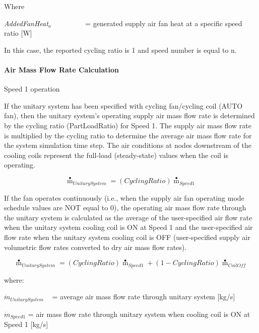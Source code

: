 Where

\emph{AddedFanHeat\(_{o}\)}~~~~~~~~~ = generated supply air fan heat at a specific speed ratio {[}W{]}

In this case, the reported cycling ratio is 1 and speed number is equal to n.

\paragraph{Air Mass Flow Rate Calculation}\label{air-mass-flow-rate-calculation}

Speed 1 operation

If the unitary system has been specified with cycling fan/cycling coil (AUTO fan), then the unitary system's operating supply air mass flow rate is determined by the cycling ratio (PartLoadRatio) for Speed 1. The supply air mass flow rate is multiplied by the cycling ratio to determine the average air mass flow rate for the system simulation time step. The air conditions at nodes downstream of the cooling coils represent the full-load (steady-state) values when the coil is operating.

\begin{equation}
{{\mathop m\limits^ \bullet  }_{UnitarySystem}} = \left( {CyclingRatio} \right){{\mathop m\limits^ \bullet  }_{Speed1}}
\end{equation}

If the fan operates continuously (i.e., when the supply air fan operating mode schedule values are NOT equal to 0), the operating air mass flow rate through the unitary system is calculated as the average of the user-specified air flow rate when the unitary system cooling coil is ON at Speed 1 and the user-specified air flow rate when the unitary system cooling coil is OFF (user-specified supply air volumetric flow rates converted to dry air mass flow rates).

\begin{equation}
{{\mathop m\limits^ \bullet  }_{UnitarySystem}} = \left( {CyclingRatio} \right){{\mathop m\limits^ \bullet  }_{Speed1}} + \left( {1 - CyclingRatio} \right){{\mathop m\limits^ \bullet  }_{CoilOff}}
\end{equation}

where:

\({\dot m_{UnitarySystem}}\) ~ = average air mass flow rate through unitary system {[}kg/s{]}

\({\dot m_{Speed1}}\) = air mass flow rate through unitary system when cooling coil is ON at Speed 1 {[}kg/s{]}


